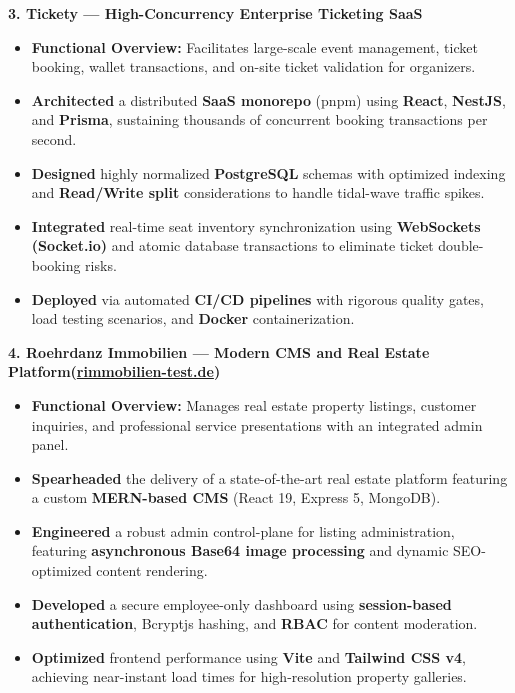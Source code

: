 \documentclass[10pt, letterpaper]{article}
\newenvironment{highlights}{
\begin{itemize}[leftmargin=12pt, itemsep=2pt]
}{
\end{itemize}
}
\begin{document}
\textbf{3. Tickety --- High-Concurrency Enterprise Ticketing SaaS}
\begin{highlights}
\item \textbf{Functional Overview:} Facilitates large-scale event management, ticket booking, wallet transactions, and on-site ticket validation for organizers.
\item \textbf{Architected} a distributed \textbf{SaaS monorepo} (pnpm) using \textbf{React}, \textbf{NestJS}, and \textbf{Prisma}, sustaining thousands of concurrent booking transactions per second.
\item \textbf{Designed} highly normalized \textbf{PostgreSQL} schemas with optimized indexing and \textbf{Read/Write split} considerations to handle tidal-wave traffic spikes.
\item \textbf{Integrated} real-time seat inventory synchronization using \textbf{WebSockets (Socket.io)} and atomic database transactions to eliminate ticket double-booking risks.
\item \textbf{Deployed} via automated \textbf{CI/CD pipelines} with rigorous quality gates, load testing scenarios, and \textbf{Docker} containerization.
\end{highlights}

\textbf{4. Roehrdanz Immobilien --- Modern CMS and Real Estate Platform(\href{https://rimmobilien-test.de}{rimmobilien-test.de})}
\begin{highlights}
\item \textbf{Functional Overview:} Manages real estate property listings, customer inquiries, and professional service presentations with an integrated admin panel.
\item \textbf{Spearheaded} the delivery of a state-of-the-art real estate platform featuring a custom \textbf{MERN-based CMS} (React 19, Express 5, MongoDB).
\item \textbf{Engineered} a robust admin control-plane for listing administration, featuring \textbf{asynchronous Base64 image processing} and dynamic SEO-optimized content rendering.
\item \textbf{Developed} a secure employee-only dashboard using \textbf{session-based authentication}, Bcryptjs hashing, and \textbf{RBAC} for content moderation.
\item \textbf{Optimized} frontend performance using \textbf{Vite} and \textbf{Tailwind CSS v4}, achieving near-instant load times for high-resolution property galleries.
\end{highlights}
\end{document}
